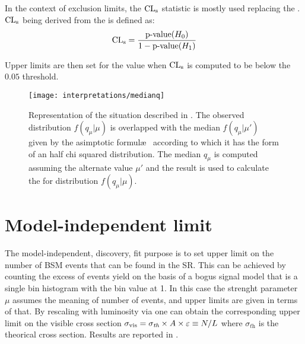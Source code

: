 In the context of exclusion limits, the $\cls$ statistic is mostly used replacing the \p. $\cls$ being derived from the \p is defined as:
\begin{equation}
	\cls=\frac{\text{p-value}(H_0)}{1-\text{p-value}(H_1)}
\end{equation}

Upper limits are then set for the value when $\cls$ is computed to be below the $0.05$ threshold.

\begin{figure}[pt]
\centering
\texttt{[image: interpretations/medianq]}
\caption{Representation of the situation described in \Sect{\ref{sec:sensitivity}}. The observed distribution $f\left(q_\mu \vert \mu \right)$ is overlapped with the median $f\left(q_\mu \vert \mu' \right)$ given by the asimptotic formul\ae~ according to which it has the form of an half chi squared distribution. The median $q_\mu$ is computed assuming the alternate value $\mu'$ and the result is used to calculate the \p for distribution $f\left(q_\mu \vert \mu \right)$.}
\label{fig:medianq}
\end{figure}

\section{Model-independent limit}
The model-independent, discovery, fit purpose is to set upper limit on the number of BSM events that can be found in the SR. This can be achieved by counting the excess of events yield on the basis of a bogus signal model that is a single bin histogram with the bin value at 1. In this case the strenght parameter $\mu$ assumes the meaning of number of events, and upper limits are given in terms of that. By rescaling with luminosity via \Eqn{\ref{eqn:Nevents}} one can obtain the corresponding upper limit on the visible cross section $\sigma_\textup{vis}=\sigma_\textit{th}\times A\times\epsilon \equiv N/L$ where $\sigma_\textit{th}$ is the theorical cross section. Results are reported in \Tab{\ref{table.results.exclxsec.pval.upperlimit.SR}}.



%


